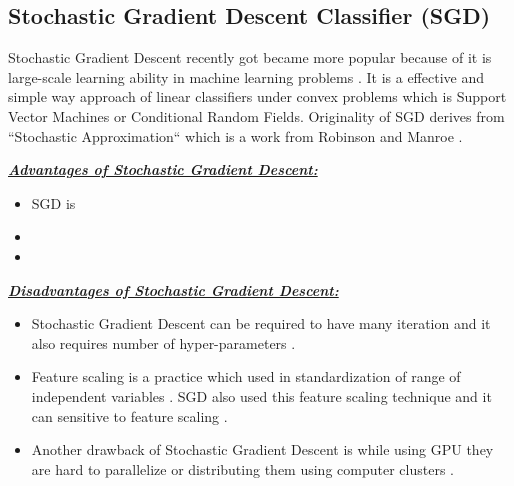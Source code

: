 \documentclass[sigconf]{acmart}
\begin{document}
\subsection{Stochastic Gradient Descent Classifier (SGD)}

Stochastic Gradient Descent recently got became more popular because of it is large-scale learning ability in machine learning problems \cite{fan-stochastic}. It is a effective and simple way approach of linear classifiers under convex problems which is Support Vector Machines or Conditional Random Fields\cite{www-bottou}. Originality of SGD derives from ``Stochastic Approximation`` which is a work from Robinson and Manroe \cite{Needell2016}. 

\textbf{\underline{\textit{Advantages of Stochastic Gradient Descent:}}}

\begin{itemize}
\item SGD is 
\item
\item
\end{itemize}

\textbf{\underline{\textit{Disadvantages of Stochastic Gradient Descent:}}}

\begin{itemize}
\item Stochastic Gradient Descent can be required to have many iteration and it also requires number of hyper-parameters \cite{www-scikit-stochastic-gradient}. 
\item Feature scaling is a practice which used in standardization of range of independent variables \cite{www-wikipedia-futurescaling}. SGD also used this feature scaling technique and it can sensitive to feature scaling \cite{www-scikit-stochastic-gradient}. 
\item Another drawback of Stochastic Gradient Descent is while using GPU they are hard to parallelize or distributing them using computer clusters \cite{andrewng-deeplearning}. 
\end{itemize}
\end{document}
